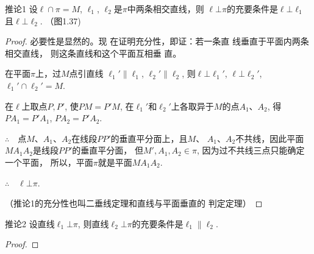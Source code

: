 \begin{blk}
{推论1} 设$\ell\cap \pi=M$, $\ell_1$, $\ell_2$是$\pi$中两条相交直线，则
$\ell\bot \pi$的充要条件是$\ell\bot \ell_1$且$\ell\bot \ell_2$.
（图1.37)
\end{blk}

\begin{proof}
必要性是显然的。现
在证明充分性，即证：若一条直
线垂直于平面内两条相交直线，
则这条直线和这个平面互相垂
直。

在平面$\pi$上，过$M$点引直线
$\ell_1'\parallel \ell_1$, $\ell_2'\parallel \ell_2$, 则$\ell\bot\ell_1'$, $\ell\bot\ell_2'$, 
$\ell_1'\cap \ell_2'=M$.

在$\ell$上取点$P,P'$, 使$PM=P'M$,
在$\ell_1'$和$\ell_2'$上各取异于$M$的点$A_1$、$A_2$, 得$PA_1=P'A_1$, $PA_2=P'A_2$.

$\therefore\quad $点$M$、$A_1$、$A_2$在线段$PP'$的垂直平分面上，且$M$、
$A_1$、$A_2$不共线，因此平面$MA_1A_2$是线段$PP'$的垂直平分面，
但$M',A_1,A_2\in \pi$, 因为过不共线三点只能确定一个平面，
所以，平面$\pi$就是平面$MA_1A_2$.

$\therefore\quad \ell\bot \pi$.

（推论1的充分性也叫二垂线定理和直线与平面垂直的
判定定理）
\end{proof}


\begin{blk}
  {推论2} 设直线$\ell_1\bot \pi$, 则直线$\ell_2\bot \pi$的充要条件是$\ell_1\parallel\ell_2$.
\end{blk}

\begin{proof}
  





\end{proof}




\begin{example}
  
\end{example}

\begin{solution}
  
\end{solution}
\begin{example}
  
\end{example}

\begin{solution}
  
\end{solution}


